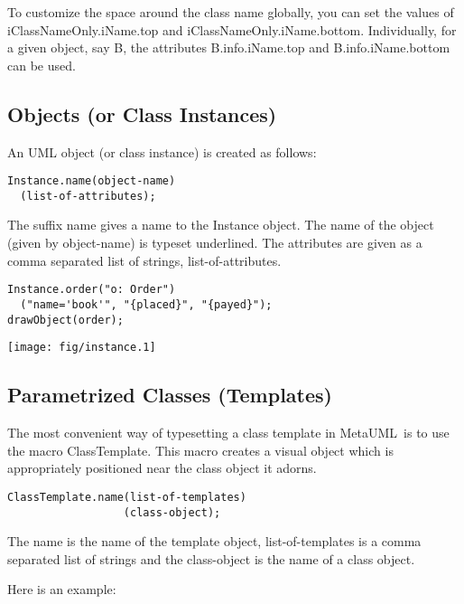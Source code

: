 \documentclass{article}
\newcommand{\code}{\ttfamily}
\newcommand{\metauml}{MetaUML}
\begin{document}
To customize the space around the class name globally, you can set the values of {\code iClassNameOnly.iName.top} and {\code iClassNameOnly.iName.bottom}. Individually, for a given object, say {\code B}, the attributes {\code B.info.iName.top} and {\code B.info.iName.bottom} can be used.

\subsection{Objects (or Class Instances)}

An UML object (or class instance) is created as follows:

\begin{verbatim}
Instance.name(object-name)
  (list-of-attributes);
\end{verbatim}

The suffix {\code name} gives a name to the {\code Instance} object. The name of the object (given by {\code object-name}) is typeset underlined. The attributes are given as a comma separated list of strings, {\code list-of-attributes}.

\begin{multicols}{2}
\begin{verbatim}
Instance.order("o: Order")
  ("name='book'", "{placed}", "{payed}");
drawObject(order);
\end{verbatim}
\columnbreak
\hspace{2cm}\texttt{[image: fig/instance.1]}
\end{multicols}


\subsection{Parametrized Classes (Templates)}

The most convenient way of typesetting a class template in \metauml\ is to use the macro {\code ClassTemplate}.
This macro creates a visual object which is appropriately positioned near the class object it adorns.

\begin{verbatim}
ClassTemplate.name(list-of-templates)
                  (class-object);
\end{verbatim}

The {\code name} is the name of the template object, {\code list-of-templates} is a comma separated list of strings and the {\code class-object} is the name of a class object.

Here is an example:
\end{document}
